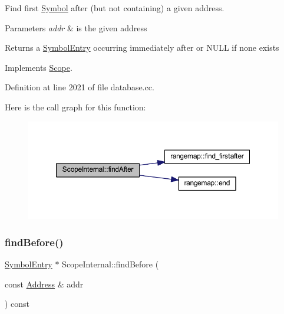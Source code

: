 Find first \mbox{\hyperlink{class_symbol}{Symbol}} after (but not containing) a given address. 


\begin{DoxyParams}{Parameters}
{\em addr} & is the given address \\
\hline
\end{DoxyParams}
\begin{DoxyReturn}{Returns}
a \mbox{\hyperlink{class_symbol_entry}{Symbol\+Entry}} occurring immediately after or N\+U\+LL if none exists 
\end{DoxyReturn}


Implements \mbox{\hyperlink{class_scope_a543041620f4398f00d2cc78edc1901b4}{Scope}}.



Definition at line 2021 of file database.\+cc.

Here is the call graph for this function\+:
\nopagebreak
\begin{figure}[H]
\begin{center}
\leavevmode
\includegraphics[width=350pt]{class_scope_internal_a922323cc754778858646c2bb82b69e17_cgraph}
\end{center}
\end{figure}
\mbox{\label{class_scope_internal_a28ae6dd136a8b285c667206417ec14a5}} 
\subsubsection{\texorpdfstring{findBefore()}{findBefore()}}
{\footnotesize\ttfamily \mbox{\hyperlink{class_symbol_entry}{Symbol\+Entry}} $\ast$ Scope\+Internal\+::find\+Before (\begin{DoxyParamCaption}\item[{const \mbox{\hyperlink{class_address}{Address}} \&}]{addr }\end{DoxyParamCaption}) const\hspace{0.3cm}{\ttfamily [virtual]}}



